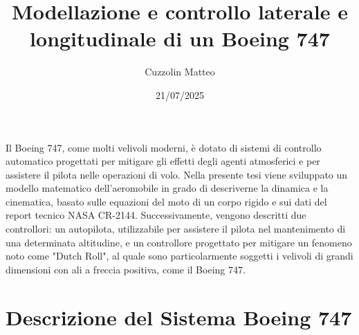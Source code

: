 \documentclass[12pt,a4paper,twoside]{extreport}
\title{Modellazione e controllo laterale e longitudinale di un Boeing 747}
\author{Cuzzolin Matteo}
\date{21/07/2025}
\begin{document}
\allowdisplaybreaks
{}
\pagestyle{empty} %


\cleardoublepage

\abstract

Il Boeing 747, come molti velivoli moderni, è dotato di sistemi di controllo automatico progettati per mitigare gli effetti degli agenti atmosferici e per assistere il pilota nelle operazioni di volo.
Nella presente tesi viene sviluppato un modello matematico dell'aeromobile in grado di descriverne la dinamica e la cinematica, basato sulle equazioni del moto di un corpo rigido e sui dati del report tecnico NASA CR-2144.
Successivamente, vengono descritti due controllori: un autopilota, utilizzabile per assistere il pilota nel mantenimento di una determinata altitudine, e un controllore progettato per mitigare un fenomeno noto come "Dutch Roll", al quale sono particolarmente soggetti i velivoli di grandi dimensioni con ali a freccia positiva, come il Boeing 747.


\cleardoublepage


\pagestyle{plain} %
\setcounter{page}{1}
\tableofcontents

\cleardoublepage
\thispagestyle{empty}
\null
\newpage


\chapter{Descrizione del Sistema Boeing 747}



\end{document}
